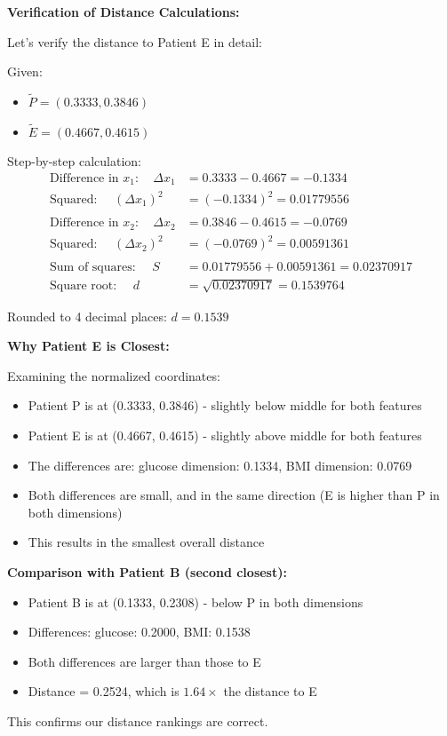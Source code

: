 \documentclass[12pt]{article}
\begin{document}
\begin{computation}
\textbf{Verification of Distance Calculations:}

Let's verify the distance to Patient E in detail:

Given:
\begin{itemize}
    \item \(\tilde{P} = (0.3333, 0.3846)\)
    \item \(\tilde{E} = (0.4667, 0.4615)\)
\end{itemize}

Step-by-step calculation:
\begin{align*}
\text{Difference in } x_1: \quad \Delta x_1 &= 0.3333 - 0.4667 = -0.1334 \\
\text{Squared: } \quad (\Delta x_1)^2 &= (-0.1334)^2 = 0.01779556 \\
\\
\text{Difference in } x_2: \quad \Delta x_2 &= 0.3846 - 0.4615 = -0.0769 \\
\text{Squared: } \quad (\Delta x_2)^2 &= (-0.0769)^2 = 0.00591361 \\
\\
\text{Sum of squares: } \quad S &= 0.01779556 + 0.00591361 = 0.02370917 \\
\text{Square root: } \quad d &= \sqrt{0.02370917} = 0.1539764
\end{align*}

Rounded to 4 decimal places: \(d = 0.1539\)

\textbf{Why Patient E is Closest:}

Examining the normalized coordinates:
\begin{itemize}
    \item Patient P is at (0.3333, 0.3846) - slightly below middle for both features
    \item Patient E is at (0.4667, 0.4615) - slightly above middle for both features
    \item The differences are: glucose dimension: 0.1334, BMI dimension: 0.0769
    \item Both differences are small, and in the same direction (E is higher than P in both dimensions)
    \item This results in the smallest overall distance
\end{itemize}

\textbf{Comparison with Patient B (second closest):}
\begin{itemize}
    \item Patient B is at (0.1333, 0.2308) - below P in both dimensions
    \item Differences: glucose: 0.2000, BMI: 0.1538
    \item Both differences are larger than those to E
    \item Distance = 0.2524, which is \(1.64 \times\) the distance to E
\end{itemize}

This confirms our distance rankings are correct.
\end{computation}
\end{document}
